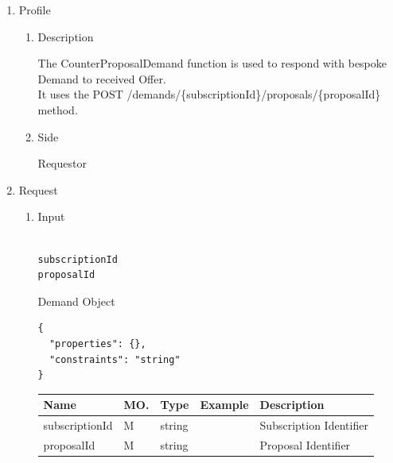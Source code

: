 \begin{enumerate}

\item Profile

\begin{enumerate}

\item Description

The CounterProposalDemand function is used to respond with bespoke Demand to received Offer. \\
It uses the POST /demands/\{subscriptionId\}/proposals/\{proposalId\} method.

\item Side

Requestor

\end{enumerate}

\item Request

\begin{enumerate}

\item Input

\begin{tcolorbox}[boxrule=0pt, frame empty]
\begin{verbatim}

subscriptionId
proposalId

\end{verbatim}
\end{tcolorbox}

Demand Object
\begin{tcolorbox}[boxrule=0pt, frame empty]
\begin{verbatim}
{
  "properties": {},
  "constraints": "string"
}
\end{verbatim}
\end{tcolorbox}

\begin{table}[H]
\footnotesize

\begin{center}
\begin{tabular}{|p{3cm}|l|p{3cm}|p{3cm}|p{4cm}|} 
\hline
\rowcolor{lightgray}	Name	& MO.	& Type	& Example & 	Description \\
\hline

subscriptionId	& M	& 	string			&		&	Subscription Identifier \\ 
\hline

proposalId		& M & 	string			&		&	Proposal Identifier \\
\hline	


\end{tabular}
\end{center}
\end{table}
\end{enumerate}
\end{enumerate}
